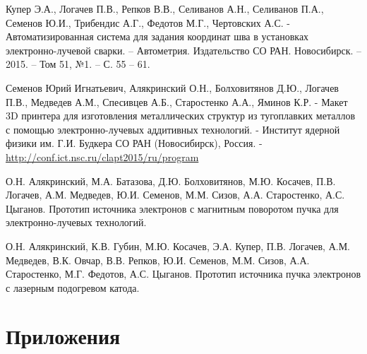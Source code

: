 \documentclass[14pt,russian,a4paper]{extarticle}
\begin{document}
\begin{thebibliography}{99}

Купер Э.А., Логачев П.В., Репков В.В., Селиванов А.Н., Селиванов П.А., Семенов Ю.И., Трибендис А.Г., Федотов М.Г., Чертовских А.С. -
Автоматизированная система для задания координат шва в установках электронно-лучевой сварки. –
Автометрия. Издательство СО РАН. Новосибирск. – 2015. – Том 51, №1. – С. 55 – 61.

Семенов Юрий Игнатьевич, Алякринский О.Н., Болховитянов Д.Ю., Логачев П.В., Медведев А.М., Спесивцев А.Б., Старостенко А.А., Яминов К.Р. -
Макет 3D принтера для изготовления металлических структур из тугоплавких металлов с помощью электронно-лучевых аддитивных технологий. -
Институт ядерной физики им. Г.И. Будкера СО РАН (Новосибирск), Россия. -
\url{http://conf.ict.nsc.ru/clapt2015/ru/program}

О.Н. Алякринский, М.А. Батазова, Д.Ю. Болховитянов, М.Ю. Косачев, П.В. Логачев, А.М. Медведев, Ю.И. Семенов, М.М. Сизов, А.А. Старостенко, А.С. Цыганов. Прототип источника электронов с магнитным поворотом пучка для электронно-лучевых технологий.

О.Н. Алякринский, К.В. Губин, М.Ю. Косачев, Э.А. Купер, П.В. Логачев, А.М. Медведев, В.К. Овчар, В.В. Репков, Ю.И. Семенов, М.М. Сизов, А.А. Старостенко, М.Г. Федотов, А.С. Цыганов. Прототип источника пучка электронов с лазерным подогревом катода.

\end{thebibliography}

\section{Приложения}
\end{document}
